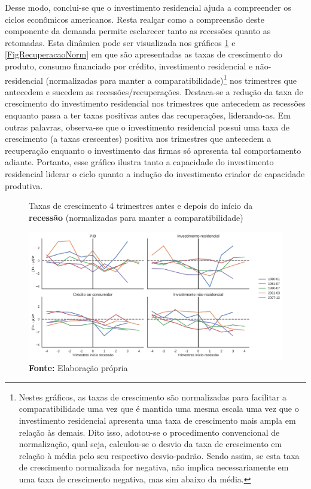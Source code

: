 Desse modo, conclui-se que o investimento residencial ajuda a compreender os ciclos econômicos americanos.
Resta realçar como a compreensão deste componente da demanda permite esclarecer tanto as recessões quanto as retomadas. Esta dinâmica pode ser visualizada nos gráficos \ref{FigCriseNorm} e \ref{FigRecuperacaoNorm} em que são apresentadas as taxas de crescimento do produto, consumo financiado por crédito, investimento residencial e não-residencial (normalizadas para manter a comparatibilidade)\footnote{
	Nestes gráficos, as taxas de crescimento são normalizadas para facilitar a comparatibilidade uma vez que é mantida uma mesma escala uma vez que o investimento residencial apresenta uma taxa de crescimento mais ampla em relação às demais. 
	Dito isso, adotou-se o procedimento convencional de normalização, qual seja, calculou-se o desvio da taxa de crescimento em relação à média pelo seu respectivo desvio-padrão.
	Sendo assim, se esta taxa de crescimento normalizada for negativa, não implica necessariamente em uma taxa de crescimento negativa, mas sim abaixo da média.
} nos trimestres que antecedem e sucedem as recessões/recuperações. 
Destaca-se a redução da taxa de crescimento do investimento residencial nos trimestres que antecedem as recessões enquanto passa a ter taxas positivas antes das recuperações, liderando-as.
Em outras palavras, observa-se que o investimento residencial possui uma taxa de crescimento (a taxas crescentes) positiva nos trimestres que antecedem a recuperação enquanto o investimento das firmas só apresenta tal comportamento adiante. Portanto, esse gráfico ilustra tanto a capacidade do investimento residencial liderar o ciclo quanto a indução do investimento criador de capacidade produtiva.


\begin{figure}[H]
	\centering
	\caption{Taxas de crescimento 4 trimestres antes e depois do início da  \textbf{recessão} (normalizadas para manter a comparatibilidade)}
	\label{FigCriseNorm}
	\includegraphics[width=\textwidth]{../../Dados/Fatos_Estilizados/figs/Centrado_Inicio_Norm.png}
	\caption*{\textbf{Fonte:} Elaboração própria}
\end{figure}

